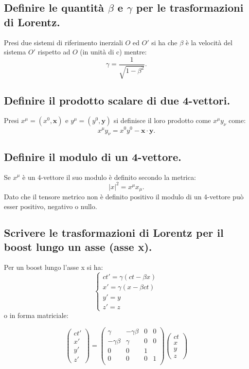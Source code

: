 \subsection[ $\beta$, $\gamma$]{Definire le quantità $\beta$ e $\gamma$ per le trasformazioni di Lorentz.} 
Presi due sistemi di riferimento inerziali $O$ ed $O'$ si ha che $\beta$ è la velocità del sistema $O'$ rispetto ad $O$ (in unità di c) mentre:
\[
	\gamma = \frac{1}{\sqrt{1-\beta^2}}
.\] 

\subsection[ Prodotto scalare nella metrica di Minkowsky]{Definire il prodotto scalare di due 4-vettori.} 
Presi $x^{\mu} = (x^0,\boldsymbol{x})$ e $y^{\mu} = ( y^0, \boldsymbol{y})$ si definisce il loro prodotto come $x^{\mu}y_{\nu}$ come:
\[
x^{\mu}y_{\nu} = x^{0}y^{0}-\boldsymbol{x} \cdot \boldsymbol{y} 
.\] 
\subsection[ Modulo di un quadrivettore]{Definire il modulo di un 4-vettore.}
Se $x^{\mu}$ è un 4-vettore il suo modulo è definito secondo la metrica:
\[
|x|^2 = x^{\mu}x_{\mu}
.\] 
Dato che il tensore metrico non è definito positivo il modulo di un 4-vettore può esser positivo, negativo o nullo. 
\subsection[ Trasformazioni di Lorentz]{Scrivere le trasformazioni di Lorentz per il boost lungo un asse (asse x).}
Per un boost lungo l'asse x si ha:
\[
\begin{cases}
	ct' = \gamma ( ct - \beta x) \\	
	x' = \gamma (x - \beta ct ) \\
	y' = y \\
	z' = z
\end{cases}
\]
o in forma matriciale:

\[
\left( \begin{array}{c} ct' \\ x' \\ y' \\ z' \end{array} \right)
= 
\begin{pmatrix}
	\gamma  & -\gamma \beta  & 0 & 0\\
	- \gamma \beta & \gamma & 0 & 0\\
	0 & 0 & 1 & \\
	0 & 0 & 0 & 1 \\
\end{pmatrix}
\left( \begin{array}{c} ct \\ x \\ y \\ z  \end{array} \right)
\] 

